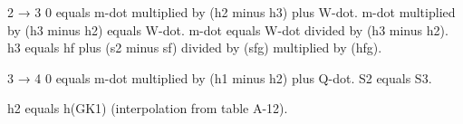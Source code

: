 2 → 3  
0 equals m-dot multiplied by (h2 minus h3) plus W-dot.  
m-dot multiplied by (h3 minus h2) equals W-dot.  
m-dot equals W-dot divided by (h3 minus h2).  
h3 equals hf plus (s2 minus sf) divided by (sfg) multiplied by (hfg).  

3 → 4  
0 equals m-dot multiplied by (h1 minus h2) plus Q-dot.  
S2 equals S3.  

h2 equals h(GK1) (interpolation from table A-12).